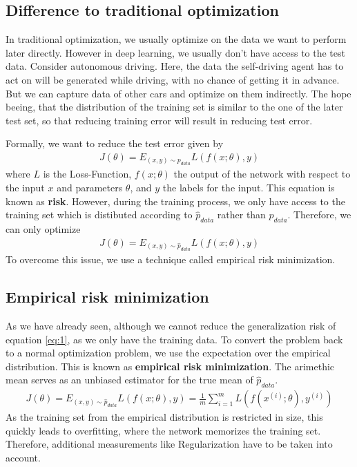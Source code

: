 \subsection{Difference to traditional optimization}\label{sub:1}
In traditional optimization, we usually optimize on the data we want to perform
later directly. However in deep learning, we usually don't have access to the
test data. Consider autonomous driving. Here, the data the self-driving agent
has to act on will be generated while driving, with no chance of getting it in
advance. But we can capture data of other cars and optimize on them indirectly.
The hope beeing, that the distribution of the training set is similar to the one
of the later test set, so that reducing training error will result in reducing
test error.

Formally, we want to reduce the test error given by
\begin{align}\label{eq:1}
    J(\theta) = E_{(x,y)\sim p_{data}} L(f(x;\theta), y)
\end{align}
where $L$ is the Loss-Function, $f(x;\theta)$ the output of the network with
respect to the input $x$ and parameters $\theta$, and $y$ the labels for the
input. This equation is known as \textbf{risk}. However, during the training
process, we only have access to the training set which is distibuted according 
to $\hat{p}_{data}$ rather than $p_{data}$. Therefore, we can only optimize
\begin{align}
    J(\theta) = E_{(x,y)\sim \hat{p}_{data}} L(f(x;\theta), y)
\end{align}
To overcome this issue, we use a technique called empirical risk minimization.

\subsection{Empirical risk minimization}\label{sub:2} As we have already seen,
although we cannot reduce the generalization risk of equation \ref{eq:1}, as we
only have the training data. To convert the problem back to a normal
optimization problem, we use the expectation over the empirical distribution.
This is known as \textbf{empirical risk minimization}. The arimethic mean
serves as an unbiased estimator for the true mean of $\hat{p}_{data}$.
\begin{align}\label{eq:3}
    J(\theta) = E_{(x,y)\sim \hat{p}_{data}} L(f(x;\theta), y) = \frac{1}{m} \sum_{i=1}^m L(f(x^{(i)}; \theta), y^{(i)})
\end{align}
As the training set from the empirical distribution is restricted in size, this
quickly leads to overfitting, where the network memorizes the training set.
Therefore, additional measurements like Regularization have to be taken into
account.


